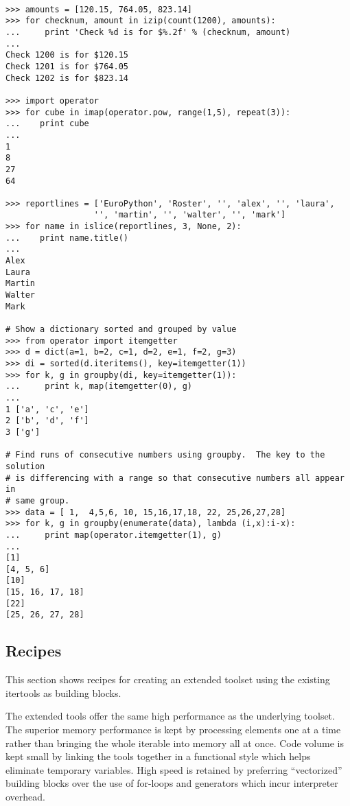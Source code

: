 \begin{verbatim}

>>> amounts = [120.15, 764.05, 823.14]
>>> for checknum, amount in izip(count(1200), amounts):
...     print 'Check %d is for $%.2f' % (checknum, amount)
...
Check 1200 is for $120.15
Check 1201 is for $764.05
Check 1202 is for $823.14

>>> import operator
>>> for cube in imap(operator.pow, range(1,5), repeat(3)):
...    print cube
...
1
8
27
64

>>> reportlines = ['EuroPython', 'Roster', '', 'alex', '', 'laura',
                  '', 'martin', '', 'walter', '', 'mark']
>>> for name in islice(reportlines, 3, None, 2):
...    print name.title()
...
Alex
Laura
Martin
Walter
Mark

# Show a dictionary sorted and grouped by value
>>> from operator import itemgetter
>>> d = dict(a=1, b=2, c=1, d=2, e=1, f=2, g=3)
>>> di = sorted(d.iteritems(), key=itemgetter(1))
>>> for k, g in groupby(di, key=itemgetter(1)):
...     print k, map(itemgetter(0), g)
...
1 ['a', 'c', 'e']
2 ['b', 'd', 'f']
3 ['g']

# Find runs of consecutive numbers using groupby.  The key to the solution
# is differencing with a range so that consecutive numbers all appear in
# same group.
>>> data = [ 1,  4,5,6, 10, 15,16,17,18, 22, 25,26,27,28]
>>> for k, g in groupby(enumerate(data), lambda (i,x):i-x):
...     print map(operator.itemgetter(1), g)
... 
[1]
[4, 5, 6]
[10]
[15, 16, 17, 18]
[22]
[25, 26, 27, 28]

\end{verbatim}


\subsection{Recipes \label{itertools-recipes}}

This section shows recipes for creating an extended toolset using the
existing itertools as building blocks.

The extended tools offer the same high performance as the underlying
toolset.  The superior memory performance is kept by processing elements one
at a time rather than bringing the whole iterable into memory all at once.
Code volume is kept small by linking the tools together in a functional style
which helps eliminate temporary variables.  High speed is retained by
preferring ``vectorized'' building blocks over the use of for-loops and
generators which incur interpreter overhead.


